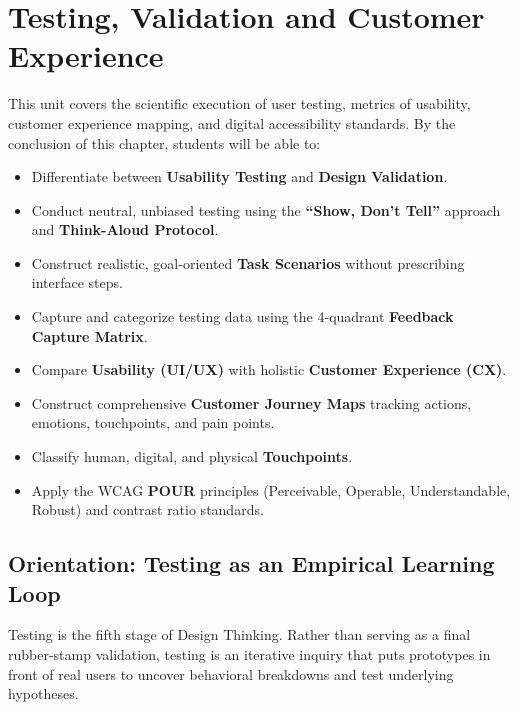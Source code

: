 \chapter{Testing, Validation and Customer Experience}
\label{chap:testing_validation_cx}

\begin{tcolorbox}[enhanced, colback=boxnavybg, colframe=brandnavy, boxrule=1.2pt, arc=4pt, title={\Large\bfseries\sffamily Unit 5 Overview \& Learning Objectives}]
\sffamily\normalsize
This unit covers the scientific execution of user testing, metrics of usability, customer experience mapping, and digital accessibility standards. By the conclusion of this chapter, students will be able to:
\begin{itemize}[leftmargin=1.2em, itemsep=2pt, topsep=3pt]
    \item Differentiate between \textbf{Usability Testing} and \textbf{Design Validation}.
    \item Conduct neutral, unbiased testing using the \textbf{``Show, Don't Tell''} approach and \textbf{Think-Aloud Protocol}.
    \item Construct realistic, goal-oriented \textbf{Task Scenarios} without prescribing interface steps.
    \item Capture and categorize testing data using the 4-quadrant \textbf{Feedback Capture Matrix}.
    \item Compare \textbf{Usability (UI/UX)} with holistic \textbf{Customer Experience (CX)}.
    \item Construct comprehensive \textbf{Customer Journey Maps} tracking actions, emotions, touchpoints, and pain points.
    \item Classify human, digital, and physical \textbf{Touchpoints}.
    \item Apply the WCAG \textbf{POUR} principles (Perceivable, Operable, Understandable, Robust) and contrast ratio standards.
\end{itemize}
\end{tcolorbox}

\section{Orientation: Testing as an Empirical Learning Loop}

Testing is the fifth stage of Design Thinking. Rather than serving as a final rubber-stamp validation, testing is an iterative inquiry that puts prototypes in front of real users to uncover behavioral breakdowns and test underlying hypotheses.

